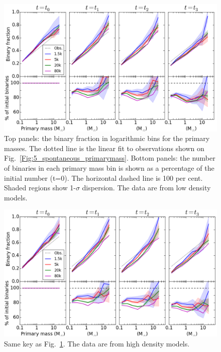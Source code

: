 \begin{figure}
\begin{center}
\includegraphics[width=\textwidth]{Figures/6_BinFrac_vs_mass_LD_dispersion}
\caption{ Top panels: the binary fraction in logarithmic bins for the primary masses. The dotted line is the linear fit to observations shown on Fig.~\protect\ref{Fig:5_spontaneous_primarymass}. Bottom panels: the number of binaries in each primary mass bin is shown as a percentage of the initial number (t=0). The horizontal dashed line is 100 per cent. Shaded regions show 1-$\sigma$ dispersion. The data are from low density models.}
\label{Fig:6_BinFracVsMass_LD}
\end{center}
\end{figure}


\begin{figure}
\begin{center}
\includegraphics[width=\textwidth]{Figures/6_BinFrac_vs_mass_HD_dispersion}
\caption{ Same key as Fig.~\protect\ref{Fig:6_BinFracVsMass_LD}.  The data are from high density models.}
\label{Fig:6_BinFracVsMass_HD}
\end{center}
\end{figure}


